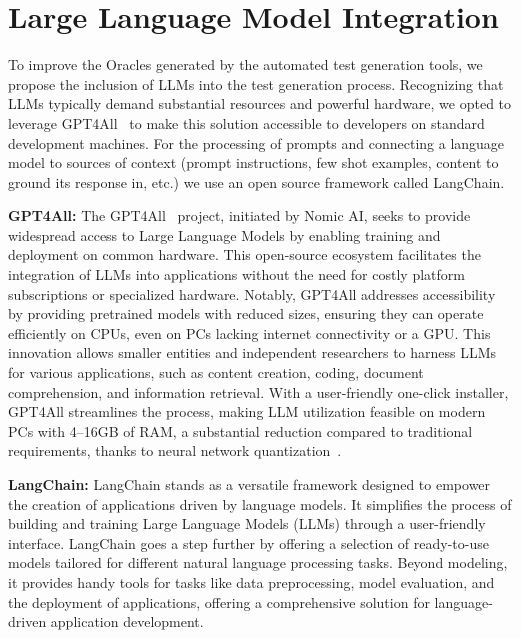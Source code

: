 \section{Large Language Model Integration}
\label{sec:llm_integration}
\vspace{0.2 cm}

To improve the Oracles generated by the automated test generation tools, we propose the inclusion of LLMs into the test generation process. Recognizing that LLMs typically demand substantial resources and powerful hardware, we opted to leverage GPT4All~\cite{noauthor_gpt4all_nodate} to make this solution accessible to developers on standard development machines. For the processing of prompts and connecting a language model to sources of context (prompt instructions, few shot examples, content to ground its response in, etc.) we use an open source framework called LangChain\cite{langchain}.

\textbf{GPT4All:} The GPT4All~\cite{noauthor_gpt4all_nodate} project, initiated by Nomic AI, seeks to provide widespread access to Large Language Models by enabling training and deployment on common hardware. This open-source ecosystem facilitates the integration of LLMs into applications without the need for costly platform subscriptions or specialized hardware. Notably, GPT4All addresses accessibility by providing pretrained models with reduced sizes, ensuring they can operate efficiently on CPUs, even on PCs lacking internet connectivity or a GPU. This innovation allows smaller entities and independent researchers to harness LLMs for various applications, such as content creation, coding, document comprehension, and information retrieval. With a user-friendly one-click installer, GPT4All streamlines the process, making LLM utilization feasible on modern PCs with 4–16GB of RAM, a substantial reduction compared to traditional requirements, thanks to neural network quantization~\cite{han_deep_2016}.

\textbf{LangChain:} LangChain\cite{langchain} stands as a versatile framework designed to empower the creation of applications driven by language models. It simplifies the process of building and training Large Language Models (LLMs) through a user-friendly interface. LangChain goes a step further by offering a selection of ready-to-use models tailored for different natural language processing tasks. Beyond modeling, it provides handy tools for tasks like data preprocessing, model evaluation, and the deployment of applications, offering a comprehensive solution for language-driven application development.

